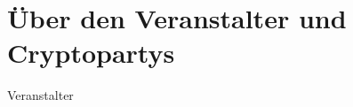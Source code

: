 \section{Über den Veranstalter und Cryptopartys}
\begin{frame}{Veranstalter}
\end{frame}

\endinput
